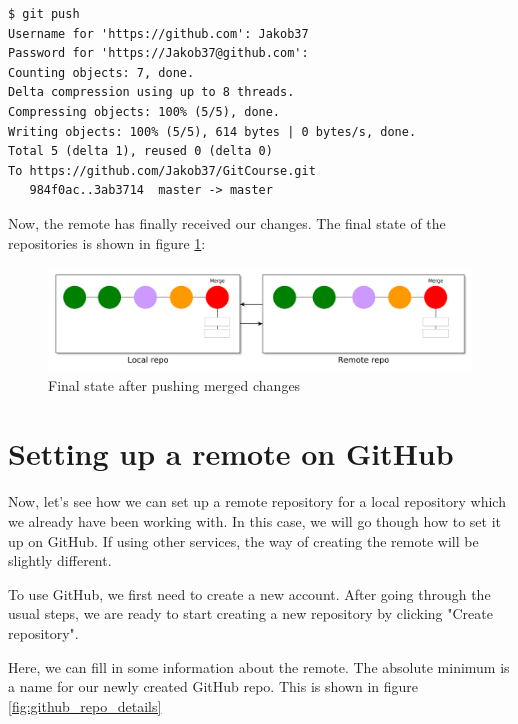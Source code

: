 \documentclass[../main/git_course_main.tex]{subfiles}
\begin{document}
\begin{codebox}
\begin{lstlisting}
$ git push
Username for 'https://github.com': Jakob37
Password for 'https://Jakob37@github.com': 
Counting objects: 7, done.
Delta compression using up to 8 threads.
Compressing objects: 100% (5/5), done.
Writing objects: 100% (5/5), 614 bytes | 0 bytes/s, done.
Total 5 (delta 1), reused 0 (delta 0)
To https://github.com/Jakob37/GitCourse.git
   984f0ac..3ab3714  master -> master
\end{lstlisting}
\end{codebox}

Now, the remote has finally received our changes. The final state of the repositories is shown in figure \ref{fig:pushing_merged_commits}:

\begin{figure}[h!]
	\centering
	\includegraphics[width=1.0\textwidth]{../visualizations/chapter5/57_pushing_merged_commits.pdf}
	\caption{Final state after pushing merged changes}
	\label{fig:pushing_merged_commits}
\end{figure}

\section{Setting up a remote on GitHub}

Now, let's see how we can set up a remote repository for a local repository which we already have been working with.
In this case, we will go though how to set it up on GitHub. If using other services, the way of creating the remote will be slightly different.

To use GitHub, we first need to create a new account. After going through the usual steps, we are ready to start creating a new repository by clicking "Create repository".

Here, we can fill in some information about the remote. The absolute minimum is a name for our newly created GitHub repo. This is shown in figure \ref{fig:github_repo_details}
\end{document}
